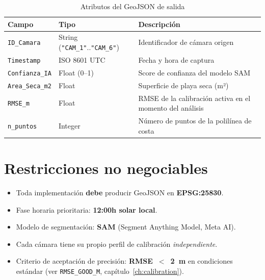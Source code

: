 \begin{table}[H]
\centering
\caption{Atributos del GeoJSON de salida}
\label{tab:geojson-fields}
\begin{tabular}{L{3.5cm} L{3.5cm} L{5.5cm}}
\toprule
\textbf{Campo} & \textbf{Tipo} & \textbf{Descripción} \\
\midrule
\texttt{ID\_Camara}    & String (\texttt{"CAM\_1"}..\texttt{"CAM\_6"}) & Identificador de cámara origen \\
\texttt{Timestamp}     & ISO 8601 UTC   & Fecha y hora de captura \\
\texttt{Confianza\_IA} & Float (0--1)   & Score de confianza del modelo SAM \\
\texttt{Area\_Seca\_m2}& Float          & Superficie de playa seca (m²) \\
\texttt{RMSE\_m}       & Float          & RMSE de la calibración activa en el momento del análisis \\
\texttt{n\_puntos}     & Integer        & Número de puntos de la polilínea de costa \\
\bottomrule
\end{tabular}
\end{table}

\section{Restricciones no negociables}

\begin{itemize}[leftmargin=1.5em]
  \item Toda implementación \textbf{debe} producir GeoJSON en \textbf{EPSG:25830}.
  \item Fase horaria prioritaria: \textbf{12:00h solar local}.
  \item Modelo de segmentación: \textbf{SAM} (Segment Anything Model, Meta AI).
  \item Cada cámara tiene su propio perfil de calibración \textit{independiente}.
  \item Criterio de aceptación de precisión: \textbf{RMSE~$<$~2~m} en condiciones estándar (ver \texttt{RMSE\_GOOD\_M}, capítulo~\ref{ch:calibration}).
\end{itemize}

